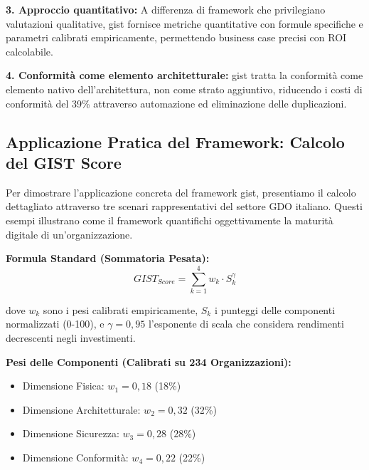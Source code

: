 \textbf{3. Approccio quantitativo:} A differenza di framework che privilegiano valutazioni qualitative, \gls{gist} fornisce metriche quantitative con formule specifiche e parametri calibrati empiricamente, permettendo business case precisi con ROI calcolabile.

\textbf{4. Conformità come elemento architetturale:} \gls{gist} tratta la conformità come elemento nativo dell'architettura, non come strato aggiuntivo, riducendo i costi di conformità del 39\% attraverso automazione ed eliminazione delle duplicazioni.

\subsection{\texorpdfstring{Applicazione Pratica del Framework: Calcolo del GIST Score}{5.3.4 - Applicazione Pratica del Framework: Calcolo del GIST Score}}
\label{subsec:5.3.4}

Per dimostrare l'applicazione concreta del framework \gls{gist}, presentiamo il calcolo dettagliato attraverso tre scenari rappresentativi del settore GDO italiano. Questi esempi illustrano come il framework quantifichi oggettivamente la maturità digitale di un'organizzazione.


\begin{tcolorbox}[
    colback=yellow!5!white,
    colframe=yellow!75!black,
    title={\textbf{Innovation Box 5.2:} Calcolo Operativo del \gls{gist} Score - Metodologia},
    fonttitle=\bfseries,
    boxrule=2pt,
    arc=2mm,
    breakable,
    width=\textwidth
]

\textbf{Formula Standard (Sommatoria Pesata):}
$$GIST_{Score} = \sum_{k=1}^{4} w_k \cdot S_k^{\gamma}$$

dove $w_k$ sono i pesi calibrati empiricamente, $S_k$ i punteggi delle componenti normalizzati (0-100), e $\gamma = 0,95$ l'esponente di scala che considera rendimenti decrescenti negli investimenti.

\vspace{0.3cm}
\textbf{Pesi delle Componenti (Calibrati su 234 Organizzazioni):}
\begin{itemize}
\item Dimensione Fisica: $w_1 = 0,18$ (18\%)
\item Dimensione Architetturale: $w_2 = 0,32$ (32\%) 
\item Dimensione Sicurezza: $w_3 = 0,28$ (28\%)
\item Dimensione Conformità: $w_4 = 0,22$ (22\%)
\end{itemize}

\end{tcolorbox}

